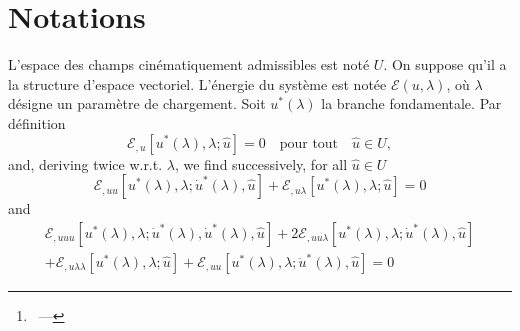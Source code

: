 \documentclass[12pt, final]{scrartcl}
\theoremstyle{definition}
\newcommand{\wrt}{w.r.t.}
\begin{document}
\title{\sbtitle}
\author{\sbauthor\thanks{\sbaddress~--- \sbemail}}
\maketitle

\begin{abstract}
  These are my notes on the LSK method for the analysis of the stability and
  bifurcation(s) of a conservative system. These notes are based on several
  references: Koiter's initial PhD thesis~\parencite{koit1945} as well as some
  graphical illustrations from his lecture notes~\parencite{koit2009}. I enjoyed
  the concise presentation of \textcite{nguy2000} as well as the lecture notes
  of \textcite{tria2017}. Finally, the chapter by \textcite{poti1987} helped me
  clear some issues.

  These notes by Sébastien Brisard are licensed under a Creative Commons
  Attribution 4.0 International License. To view a copy of this license, visit
  \url{http://creativecommons.org/licenses/by/4.0/}.

  I hope the reader will find these notes useful, even though there are still a
  few points which I do not fully understand (they are clearly indicated in the
  text).
\end{abstract}

\section{Notations}

L'espace des champs cinématiquement admissibles est noté \(U\). On suppose qu'il
a la structure d'espace vectoriel. L'énergie du système est notée \(ℰ(u, λ)\),
où \(λ\) désigne un paramètre de chargement. Soit \(u^{\ast}(λ)\) la branche
fondamentale. Par définition
\begin{equation}
  ℰ_{,u}[u^{\ast}(λ), λ; \hat{u}]=0 \quad \text{pour tout} \quad \hat{u}∈U,
\end{equation}
and, deriving twice \wrt{} \(λ\), we find successively, for all \(\hat{u} ∈ U\)
\begin{equation}
  \label{eq:20220901143843}
  ℰ_{,uu}[u^\ast(λ), λ; \dot{u}^\ast(λ), \hat{u}] + ℰ_{,uλ}[u^\ast(λ), λ; \hat{u}] = 0
\end{equation}
and
\begin{multline}
  \label{eq:20220901143902}
  ℰ_{,uuu}[u^\ast(λ), λ; \dot{u}^\ast(λ), \dot{u}^\ast(λ), \hat{u}] + 2ℰ_{,uuλ}[u^\ast(λ), λ; \dot{u}^\ast(λ), \hat{u}]\\
  + ℰ_{,uλλ}[u^\ast(λ), λ; \hat{u}] + ℰ_{,uu}[u^\ast(λ), λ; \ddot{u}^\ast(λ), \hat{u}] = 0
\end{multline}
\end{document}
